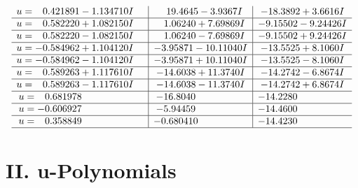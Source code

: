 \documentclass[1p]{elsarticle_modified}
\theoremstyle{definition}
\begin{document}
$$\begin{array}{c|c|c}
\begin{aligned}
u &= \phantom{-}0.421891 - 1.134710 I\end{aligned}
 & \phantom{-}19.4645 - 3.9367 I & -18.3892 + 3.6616 I \\ \hline\begin{aligned}
u &= \phantom{-}0.582220 + 1.082150 I\end{aligned}
 & \phantom{-}1.06240 + 7.69869 I & -9.15502 - 9.24426 I \\ \hline\begin{aligned}
u &= \phantom{-}0.582220 - 1.082150 I\end{aligned}
 & \phantom{-}1.06240 - 7.69869 I & -9.15502 + 9.24426 I \\ \hline\begin{aligned}
u &= -0.584962 + 1.104120 I\end{aligned}
 & -3.95871 - 10.11040 I & -13.5525 + 8.1060 I \\ \hline\begin{aligned}
u &= -0.584962 - 1.104120 I\end{aligned}
 & -3.95871 + 10.11040 I & -13.5525 - 8.1060 I \\ \hline\begin{aligned}
u &= \phantom{-}0.589263 + 1.117610 I\end{aligned}
 & -14.6038 + 11.3740 I & -14.2742 - 6.8674 I \\ \hline\begin{aligned}
u &= \phantom{-}0.589263 - 1.117610 I\end{aligned}
 & -14.6038 - 11.3740 I & -14.2742 + 6.8674 I \\ \hline\begin{aligned}
u &= \phantom{-}0.681978\phantom{ +0.000000I}\end{aligned}
 & -16.8040\phantom{ +0.000000I} & -14.2280\phantom{ +0.000000I} \\ \hline\begin{aligned}
u &= -0.606927\phantom{ +0.000000I}\end{aligned}
 & -5.94459\phantom{ +0.000000I} & -14.4600\phantom{ +0.000000I} \\ \hline\begin{aligned}
u &= \phantom{-}0.358849\phantom{ +0.000000I}\end{aligned}
 & -0.680410\phantom{ +0.000000I} & -14.4230\phantom{ +0.000000I}\\
 \hline 
 \end{array}$$\newpage
\newpage\renewcommand{\arraystretch}{1}
\centering \section*{ II. u-Polynomials}
\end{document}
